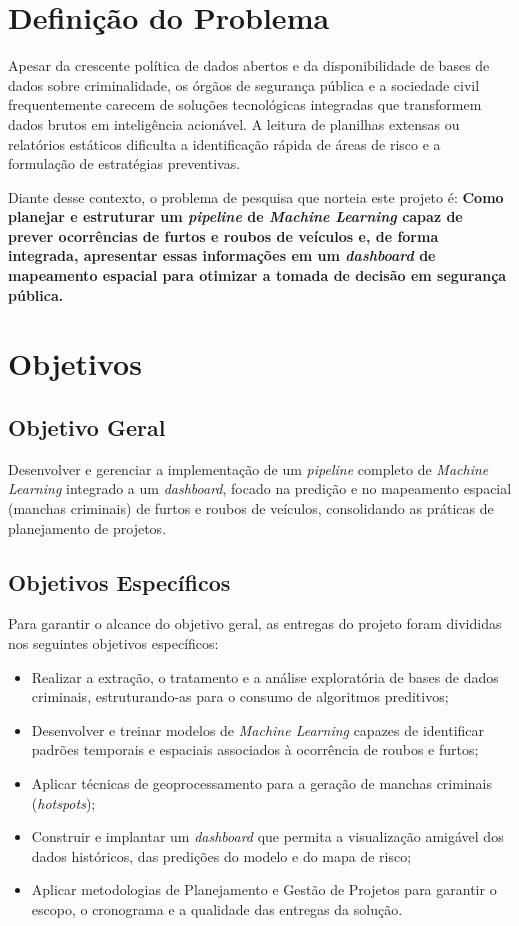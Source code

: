 \documentclass[12pt]{article}
\begin{document}
\section{Definição do Problema}
Apesar da crescente política de dados abertos e da disponibilidade de bases de dados sobre criminalidade, os órgãos de segurança pública e a sociedade civil frequentemente carecem de soluções tecnológicas integradas que transformem dados brutos em inteligência acionável. A leitura de planilhas extensas ou relatórios estáticos dificulta a identificação rápida de áreas de risco e a formulação de estratégias preventivas. 

Diante desse contexto, o problema de pesquisa que norteia este projeto é: \textbf{Como planejar e estruturar um \textit{pipeline} de \textit{Machine Learning} capaz de prever ocorrências de furtos e roubos de veículos e, de forma integrada, apresentar essas informações em um \textit{dashboard} de mapeamento espacial para otimizar a tomada de decisão em segurança pública.}

\section{Objetivos}

\subsection{Objetivo Geral}
Desenvolver e gerenciar a implementação de um \textit{pipeline} completo de \textit{Machine Learning} integrado a um \textit{dashboard}, focado na predição e no mapeamento espacial (manchas criminais) de furtos e roubos de veículos, consolidando as práticas de planejamento de projetos.

\subsection{Objetivos Específicos}
Para garantir o alcance do objetivo geral, as entregas do projeto foram divididas nos seguintes objetivos específicos:
\begin{itemize}
    \item Realizar a extração, o tratamento e a análise exploratória de bases de dados criminais, estruturando-as para o consumo de algoritmos preditivos;
    \item Desenvolver e treinar modelos de \textit{Machine Learning} capazes de identificar padrões temporais e espaciais associados à ocorrência de roubos e furtos;
    \item Aplicar técnicas de geoprocessamento para a geração de manchas criminais (\textit{hotspots});
    \item Construir e implantar um \textit{dashboard} que permita a visualização amigável dos dados históricos, das predições do modelo e do mapa de risco;
    \item Aplicar metodologias de Planejamento e Gestão de Projetos para garantir o escopo, o cronograma e a qualidade das entregas da solução.
\end{itemize}
\end{document}
